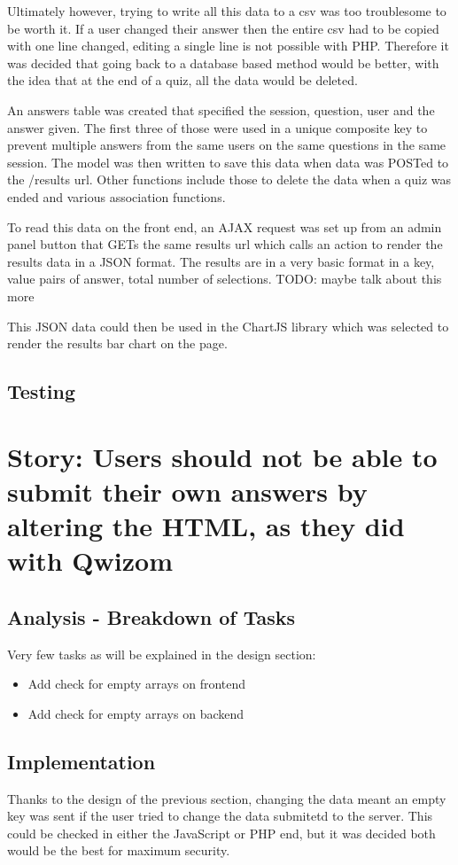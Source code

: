 \documentclass{article}
\begin{document}
Ultimately however, trying to write all this data to a csv was too troublesome to be worth it. If a user changed their answer then the entire csv had to be copied with one line changed, editing a single line is not possible with PHP. Therefore it was decided that going back to a database based method would be better, with the idea that at the end of a quiz, all the data would be deleted.

An answers table was created that specified the session, question, user and the answer given. The first three of those were used in a unique composite key to prevent multiple answers from the same users on the same questions in the same session. The model was then written to save this data when data was POSTed to the /results url. Other functions include those to delete the data when a quiz was ended and various association functions.

To read this data on the front end, an AJAX request was set up from an admin panel button that GETs the same results url which calls an action to render the results data in a JSON format. The results are in a very basic format in a key, value pairs of answer, total number of selections. TODO: maybe talk about this more

This JSON data could then be used in the ChartJS library which was selected to render the results bar chart on the page.
\subsection{Testing}
\newpage

\section{Story: Users should not be able to submit their own answers by altering the HTML, as they did with Qwizom}
\subsection{Analysis - Breakdown of Tasks}
Very few tasks as will be explained in the design section:
\begin{itemize}
	\item Add check for empty arrays on frontend
	\item Add check for empty arrays on backend
\end{itemize}
\subsection{Implementation}
Thanks to the design of the previous section, changing the data meant an empty key was sent if the user tried to change the data submitetd to the server. This could be checked in either the JavaScript or PHP end, but it was decided both would be the best for maximum security. 
\end{document}
